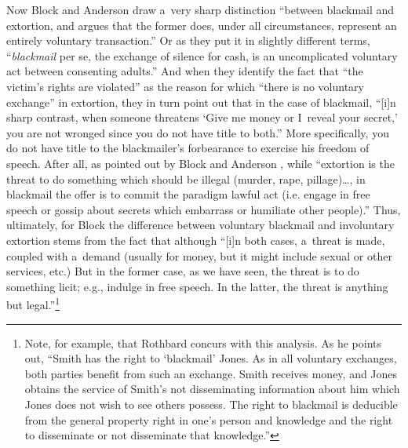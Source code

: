 Now Block and Anderson 
\parencite*[][p.544]{block_blackmail_2000} %
 draw a~very sharp distinction ``between blackmail and extortion, and argues that the former does, under all circumstances, represent an entirely voluntary transaction.'' Or as they 
\parencite*[][p.560]{} %
 put it in slightly different terms, ``\textit{blackmail} per se, the exchange of silence for cash, is an uncomplicated voluntary act between consenting adults.'' And when they 
\parencite*[][p.546]{} %
 identify the fact that ``the victim's rights are violated'' as the reason for which ``there is no voluntary exchange'' in extortion, they 
\parencite*[][p.546]{} %
 in turn point out that in the case of blackmail, ``[i]n sharp contrast, when someone threatens ‘Give me money or I~reveal your secret,' you are not wronged since you do not have title to both.'' More specifically, you do not have title to the blackmailer's forbearance to exercise his freedom of speech. After all, as pointed out by Block and Anderson 
\parencite*[][p.546]{block_blackmail_2000}, %
 while ``extortion is the threat to do something which should be illegal (murder, rape, pillage)…, in blackmail the offer is to commit the paradigm lawful act (i.e. engage in free speech or gossip about secrets which embarrass or humiliate other people).'' Thus, ultimately, for Block 
\parencite*[][p.281]{block_libertarian_1998} %
 the difference between voluntary blackmail and involuntary extortion stems from the fact that although ``[i]n both cases, a~threat is made, coupled with a~demand (usually for money, but it might include sexual or other services, etc.) But in the former case, as we have seen, the threat is to do something licit; e.g., indulge in free speech. In the latter, the threat is anything but legal.''\footnote{Note, for example, that Rothbard concurs with this analysis. As he 
\parencite*[][p.124]{} %
 points out, ``Smith has the right to ‘blackmail' Jones. As in all voluntary exchanges, both parties benefit from such an exchange. Smith receives money, and Jones obtains the service of Smith's not disseminating information about him which Jones does not wish to see others possess. The right to blackmail is deducible from the general property right in one's person and knowledge and the right to disseminate or not disseminate that knowledge.''}



